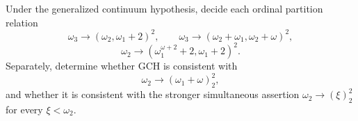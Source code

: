 Under the generalized continuum hypothesis, decide each ordinal partition relation
\[
\omega_3\longrightarrow(\omega_2,\omega_1+2)^2,
\qquad
\omega_3\longrightarrow(\omega_2+\omega_1,\omega_2+\omega)^2,
\]
\[
\omega_2\longrightarrow(\omega_1^{\omega+2}+2,\omega_1+2)^2.
\]
Separately, determine whether GCH is consistent with
\[
\omega_2\longrightarrow(\omega_1+\omega)^2_2,
\]
and whether it is consistent with the stronger simultaneous assertion $\omega_2\longrightarrow(\xi)^2_2$ for every $\xi<\omega_2$.

